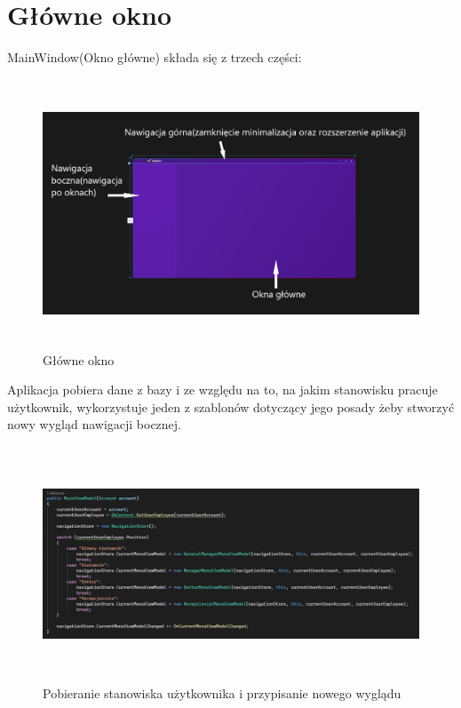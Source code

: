\section{Główne okno}

MainWindow(Okno główne) składa się z trzech części:

\begin{figure}[H]
\begin{center}
    \includegraphics[height=8cm]{images/mainwindow.png}
    \caption{Główne okno}
\end{center}
\end{figure}

Aplikacja pobiera dane z bazy i ze względu na to, na jakim stanowisku pracuje użytkownik, wykorzystuje jeden z szablonów dotyczący jego posady żeby stworzyć nowy wygląd nawigacji bocznej.

\begin{figure}[H]
\begin{center}
    \includegraphics[height=7cm]{images/mainviewmodel_const.png}
    \caption{Pobieranie stanowiska użytkownika i przypisanie nowego wyglądu}
\end{center}
\end{figure}

